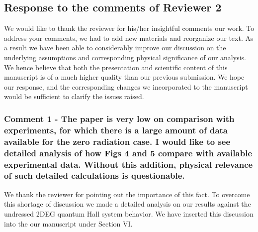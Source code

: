 \documentclass{article}
\begin{document}
\newpage
\subsection*{Response to the comments of Reviewer 2}

We would like to thank the reviewer for his/her insightful comments our work. To address your comments, we had to add new materials and reorganize our text. As a result we have been able to considerably improve our discussion on the underlying assumptions and corresponding physical significance of our analysis. We hence believe that both the presentation and scientific content of this manuscript is of a much higher quality than our previous submission. We hope our response, and the corresponding changes we incorporated to the manuscript would be sufficient to clarify the issues raised.


\subsubsection*{Comment 1 -
\color{RoyalBlue} The paper is very low on comparison with experiments, for which there is a large amount of data available for the zero radiation case. I would like to see detailed analysis of how Figs 4 and 5 compare with available
experimental data. Without this addition, physical relevance of such
detailed calculations is questionable.
}

We thank the reviewer for pointing out the importance of this fact. To overcome this shortage of discussion we made a detailed analysis on our results against the undressed 2DEG quantum Hall system behavior. We have inserted this discussion into the our manuscript under Section VI.
\end{document}

